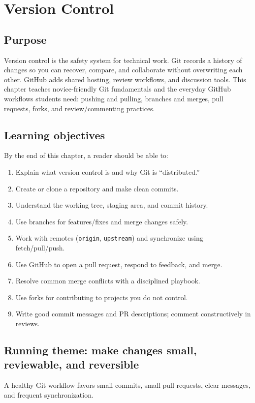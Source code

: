 \chapter{Version Control}
\label{ch:git-github}

\section*{Purpose}
Version control is the safety system for technical work. Git records a history of changes so you can recover, compare, and collaborate without overwriting each other. GitHub adds shared hosting, review workflows, and discussion tools. This chapter teaches novice-friendly Git fundamentals and the everyday GitHub workflows students need: pushing and pulling, branches and merges, pull requests, forks, and review/commenting practices.

\section*{Learning objectives}
By the end of this chapter, a reader should be able to:
\begin{enumerate}
\item Explain what version control is and why Git is ``distributed.''
\item Create or clone a repository and make clean commits.
\item Understand the working tree, staging area, and commit history.
\item Use branches for features/fixes and merge changes safely.
\item Work with remotes (\texttt{origin}, \texttt{upstream}) and synchronize using fetch/pull/push.
\item Use GitHub to open a pull request, respond to feedback, and merge.
\item Resolve common merge conflicts with a disciplined playbook.
\item Use forks for contributing to projects you do not control.
\item Write good commit messages and PR descriptions; comment constructively in reviews.
\end{enumerate}

\section*{Running theme: make changes small, reviewable, and reversible}
A healthy Git workflow favors small commits, small pull requests, clear messages, and frequent synchronization.

